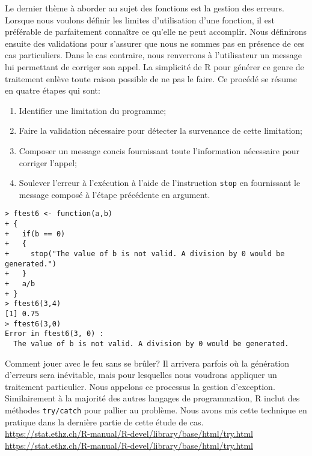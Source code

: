 \vspace{\baselineskip}
Le dernier thème à aborder au sujet des fonctions est la gestion des erreurs. Lorsque nous voulons définir les limites d'utilisation d'une fonction, il est préférable de parfaitement connaître ce qu'elle ne peut accomplir. Nous définirons ensuite des validations pour s'assurer que nous ne sommes pas en présence de ces cas particuliers. Dans le cas contraire, nous renverrons à l'utilisateur un message lui permettant de corriger son appel. La simplicité de R pour générer ce genre de traitement enlève toute raison possible de ne pas le faire. Ce procédé se résume en quatre étapes qui sont:
\begin{enumerate}
	\item Identifier une limitation du programme;
	\item Faire la validation nécessaire pour détecter la survenance de cette limitation;
	\item Composer un message concis fournissant toute l'information nécessaire pour corriger l'appel;
	\item Soulever l'erreur à l'exécution à l'aide de l'instruction \texttt{stop} en fournissant le message composé à l'étape précédente en argument.
\end{enumerate}

\begin{lstlisting}[caption = Gestion des erreurs sous R,label=src:errorManagement]
> ftest6 <- function(a,b)
+ {
+   if(b == 0)
+   {
+     stop("The value of b is not valid. A division by 0 would be generated.")
+   }
+   a/b
+ }
> ftest6(3,4)
[1] 0.75
> ftest6(3,0)
Error in ftest6(3, 0) : 
  The value of b is not valid. A division by 0 would be generated.
\end{lstlisting}

\begin{moreInfo}{Comment jouer avec le feu sans se brûler?}
	Il arrivera parfois où la génération d'erreurs sera inévitable, mais pour lesquelles nous voudrons appliquer un traitement particulier. Nous appelons ce processus la gestion d'exception. Similairement à la majorité des autres langages de programmation, R inclut des méthodes \texttt{try/catch} pour pallier au problème. Nous avons mis cette technique en pratique dans la dernière partie de cette étude de cas. \\
	\url{https://stat.ethz.ch/R-manual/R-devel/library/base/html/try.html} \\
	\url{https://stat.ethz.ch/R-manual/R-devel/library/base/html/try.html}
\end{moreInfo}

